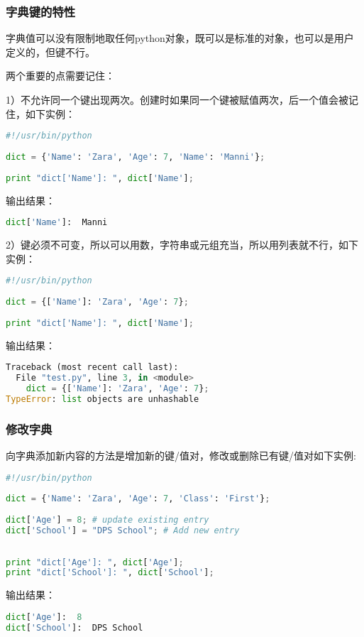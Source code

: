 \subsubsection{字典键的特性}
字典值可以没有限制地取任何python对象，既可以是标准的对象，也可以是用户定义的，但键不行。

两个重要的点需要记住：

1）不允许同一个键出现两次。创建时如果同一个键被赋值两次，后一个值会被记住，如下实例：
\begin{lstlisting}[language=Python]
#!/usr/bin/python
 
dict = {'Name': 'Zara', 'Age': 7, 'Name': 'Manni'};
 
print "dict['Name']: ", dict['Name'];
\end{lstlisting}
输出结果：
\begin{lstlisting}[language=Python]
dict['Name']:  Manni
\end{lstlisting}

2）键必须不可变，所以可以用数，字符串或元组充当，所以用列表就不行，如下实例：
\begin{lstlisting}[language=Python]
#!/usr/bin/python
 
dict = {['Name']: 'Zara', 'Age': 7};
 
print "dict['Name']: ", dict['Name'];
\end{lstlisting}
输出结果：
\begin{lstlisting}[language=Python]
Traceback (most recent call last):
  File "test.py", line 3, in <module>
    dict = {['Name']: 'Zara', 'Age': 7};
TypeError: list objects are unhashable
\end{lstlisting}



\subsubsection{修改字典}
向字典添加新内容的方法是增加新的键/值对，修改或删除已有键/值对如下实例:
\begin{lstlisting}[language=Python]
#!/usr/bin/python
 
dict = {'Name': 'Zara', 'Age': 7, 'Class': 'First'};
 
dict['Age'] = 8; # update existing entry
dict['School'] = "DPS School"; # Add new entry
 
 
print "dict['Age']: ", dict['Age'];
print "dict['School']: ", dict['School'];
\end{lstlisting}
输出结果：
\begin{lstlisting}[language=Python]
dict['Age']:  8
dict['School']:  DPS School
\end{lstlisting}



